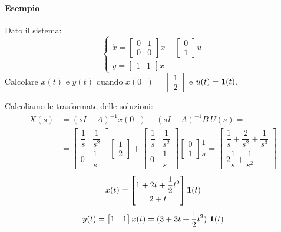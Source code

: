 \documentclass[../main.tex]{subfiles}
\begin{document}
		\begin{mdframed}[style=Esempio]
			\paragraph{Esempio}
			Dato il sistema:
			\[
				\begin{cases}
					\dot x =
					\begin{bmatrix}
						0 & 1\\
						0 & 0
					\end{bmatrix} x + 
					\begin{bmatrix}
						0\\
						1
					\end{bmatrix} u
					\\[1em]
					y = 
					\begin{bmatrix}
						1 & 1
					\end{bmatrix}  x
				\end{cases}
			\]
			Calcolare $ x(t) $ e $ y(t) $ quando $ x(0^-) = \begin{bmatrix} 1\\ 2 \end{bmatrix} $ e $ u(t) = \textbf{1}(t) $.
			
			Calcoliamo le trasformate delle soluzioni:
			\begin{align*}
				X(s) &= (sI-A)^{-1} x(0^-) + (sI-A)^{-1} B\ U(s) =
				\\
				&= 
				\begin{bmatrix}
					\dfrac{1}{s} & \dfrac{1}{s^2}
					\\[1em]
					0 & \dfrac{1}{s}
				\end{bmatrix}
				\begin{bmatrix}
					1
					\\[1em]
					2
				\end{bmatrix} + 
				\begin{bmatrix}
					\dfrac{1}{s} & \dfrac{1}{s^2}
					\\[1em]
					0 & \dfrac{1}{s}
				\end{bmatrix}
				\begin{bmatrix}
					0
					\\[1em]
					1
				\end{bmatrix} \dfrac{1}{s} = 
				\begin{bmatrix}
					\dfrac{1}{s}+\dfrac{2}{s^2}+\dfrac{1}{s^3}
					\\[1em]
					2\dfrac{1}{s}+\dfrac{1}{s^2}
				\end{bmatrix}
			\end{align*}
			\[
				x(t) = 
				\begin{bmatrix}
					1+2t+\dfrac{1}{2} t^2
					\\[.5em]
					2+t
				\end{bmatrix} \textbf{1}(t)
			\]
			\[
				y(t) = 
				\begin{bmatrix}
					1 & 1
				\end{bmatrix}
				x(t) = (3 + 3t + \dfrac{1}{2} t^2)\ \textbf{1}(t)
			\]
		\end{mdframed}
\end{document}
